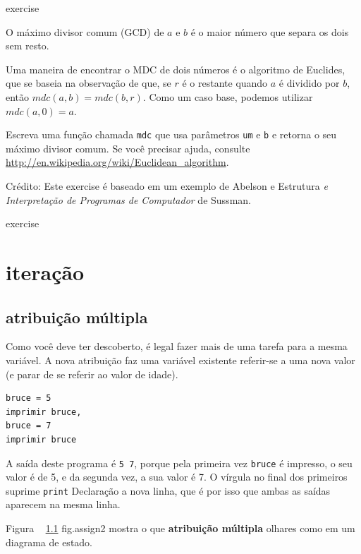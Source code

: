 \documentclass[10pt]{book}
\begin{document}
\begin{exercise}
{{\begin{} exercise

O máximo divisor comum (GCD) de $ a $ e $ b $ é o maior número
que separa os dois sem resto.  

Uma maneira de encontrar o MDC de dois números é o algoritmo de Euclides,
que se baseia na observação de que, se $ r $ é o restante
quando $ a $ é dividido por $ b $, então $ mdc (a, b) = mdc (b, r) $.
Como um caso base, podemos utilizar $ mdc (a, 0) = a $.

Escreva uma função chamada
\Verb "mdc" que usa parâmetros {\tt um} e {\tt b}
e retorna o seu máximo divisor comum. Se você precisar
ajuda, consulte \url{http://en.wikipedia.org/wiki/Euclidean_algorithm}.

Crédito: Este exercise é baseado em um exemplo de Abelson e
{Estrutura \em e Interpretação de Programas de Computador} de Sussman.

\end{} exercise


\chapter{iteração}

\section{atribuição múltipla}

Como você deve ter descoberto, é legal
fazer mais de uma tarefa para a mesma variável. A
nova atribuição faz uma variável existente referir-se a uma nova
valor (e parar de se referir ao valor de idade).

\begin{verbatim}
bruce = 5
imprimir bruce,
bruce = 7
imprimir bruce
\end{verbatim}
%
A saída deste programa é {\tt 5 7}, porque pela primeira vez
{\tt bruce} é impresso, o seu valor é de 5, e da segunda vez, a sua
valor é 7. O
vírgula no final dos primeiros suprime {\tt print} Declaração
a nova linha, que é por isso que ambas as saídas
aparecem na mesma linha.

Figura ~ \ref {} fig.assign2 mostra o que {\bf atribuição múltipla} olhares
como em um diagrama de estado.  

}}
\end{exercise}
\end{document}
